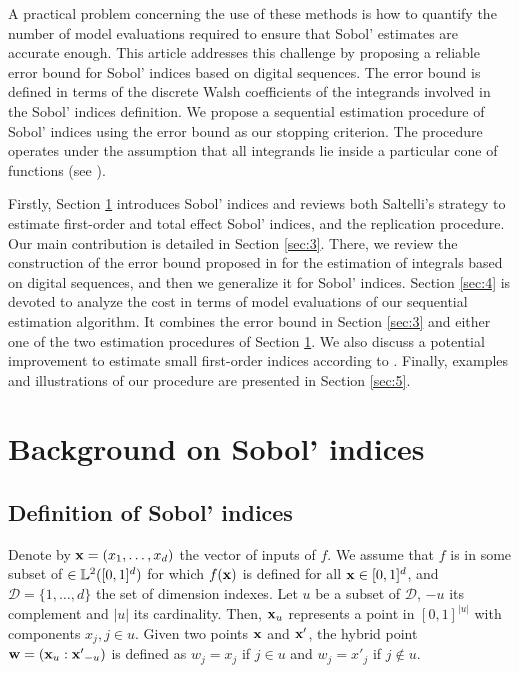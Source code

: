 A practical problem concerning the use of these methods is how to quantify the number of model evaluations required to ensure that Sobol' estimates are accurate enough. This article addresses this challenge by proposing a reliable error bound for Sobol' indices based on digital sequences. The error bound is defined in terms of the discrete Walsh coefficients of the integrands involved in the Sobol' indices definition. We propose a sequential estimation procedure of Sobol' indices using the error bound as our stopping criterion. The procedure operates under the assumption that all integrands lie inside a particular cone of functions (see \cite{HicJim}).

Firstly, Section \ref{sec:2} introduces Sobol' indices and reviews both Saltelli's strategy to estimate first-order and total effect Sobol' indices, and the replication procedure. Our main contribution is detailed in  Section \ref{sec:3}. There, we review the construction of the error bound proposed in \cite{HicJim} for the estimation of integrals based on digital sequences, and then we generalize it for Sobol' indices. Section \ref{sec:4} is devoted to analyze the cost in terms of model evaluations of our sequential estimation algorithm. It combines the error bound in Section \ref{sec:3} and either one of the two estimation procedures of Section \ref{sec:2}. We also discuss a potential improvement to estimate small first-order indices according to \cite{Owen}. Finally, examples and illustrations of our procedure are presented in Section \ref{sec:5}. 

\section{Background on Sobol' indices}
\label{sec:2}

\subsection{Definition of Sobol' indices}
\label{sec:2.1}
Denote by $\boldsymbol{\mathbf{x}}=(x_1,\dots,x_d)$ the vector of inputs of $f$. We assume that $f$ is in some subset of $\in \mathbb{L}^2([0,1]^d)$ for which $f(\boldsymbol{\mathbf{x}})$ is defined for all $\boldsymbol{\mathbf{x}}\in[0,1]^d$, and $\mathcal{D}=\{1,\dots,d\}$ the set of dimension indexes. %
Let $u$ be a subset of $\mathcal{D}$, $-u$ its complement and $|u|$ its cardinality. Then, $\boldsymbol{\mathbf{x}}_u$ represents a point in $[0,1]^{|u|}$ with components $x_j, j \in u$. Given two points $\boldsymbol{\mathbf{x}}$ and $\boldsymbol{\mathbf{x}}'$, the hybrid point $\boldsymbol{\mathbf{w}}=(\boldsymbol{\mathbf{x}}_u:{\boldsymbol{\mathbf{x}}'}_{-u})$ is defined as $w_j=x_j$ if $j \in u$ and $w_j=x'_j$ if $j \notin u$.%

